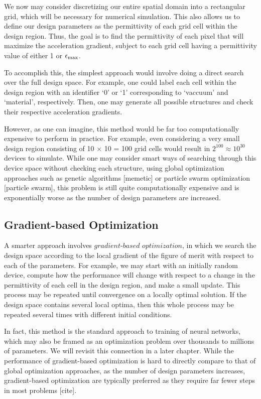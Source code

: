 We now may consider discretizing our entire spatial domain into a rectangular grid, which will be necessary for numerical simulation.
This also allows us to define our design parameters as the permittivity of each grid cell within the design region.  Thus, the goal is to find the permittivity of each pixel that will maximize the acceleration gradient, subject to each grid cell having a permittivity value of either 1 or $\epsilon_\textrm{max}$.

To accomplish this, the simplest approach would involve doing a direct search over the full design space.  For example, one could label each cell within the design region with an identifier `0' or `1' corresponding to `vaccuum' and `material', respectively.  Then, one may generate all possible structures and check their respective acceleration gradients.

However, as one can imagine, this method would be far too computationally expensive to perform in practice.
For example, even considering a very small design region consisting of 10 $\times$ 10 = 100 grid cells would result in $2^{100} \approx 10^{30}$ devices to simulate.
While one may consider smart ways of searching through this device space without checking each structure, using global optimization approaches such as genetic algorithms [memetic] or particle swarm optimization [particle swarm], this problem is still quite computationally expensive and is exponentially worse as the number of design parameters are increased.

\subsection{Gradient-based Optimization}

A smarter approach involves $\textit{gradient-based optimization}$, in which we search the design space according to the local gradient of the figure of merit with respect to each of the parameters.
For example, we may start with an initially random device, compute how the performance will change with respect to a change in the permittivity of each cell in the design region, and make a small update.
This process may be repeated until convergence on a locally optimal solution.
If the design space contains several local optima, then this whole process may be repeated several times with different initial conditions.

In fact, this method is the standard approach to training of neural networks, which may also be framed as an optimization problem over thousands to millions of parameters.
We will revisit this connection in a later chapter.
While the performance of gradient-based optimization is hard to directly compare to that of global optimization approaches, as the number of design parameters increases, gradient-based optimization are typically preferred as they require far fewer steps in most problems [cite].

